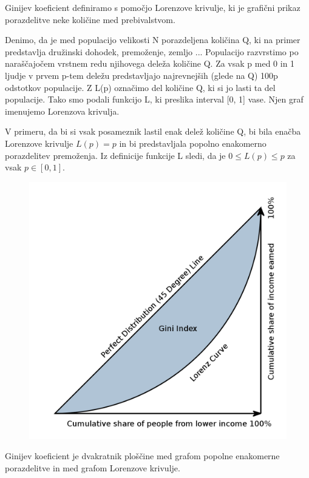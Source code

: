 \documentclass[a4paper,12 pt]{article}
\begin{document}
Ginijev  koeficient  definiramo  s  pomočjo  Lorenzove  krivulje,  ki  je  grafični  prikaz porazdelitve neke količine med prebivalstvom.

Denimo,  da  je  med  populacijo  velikosti  N  porazdeljena  količina  Q,  ki  na  primer  predstavlja  družinski  dohodek,  premoženje,  zemljo  ...   Populacijo  razvrstimo po naraščajočem vrstnem redu njihovega deleža količine  Q.  Za vsak p med 0 in 1 ljudje v prvem p-tem deležu predstavljajo najrevnejših (glede na Q) 100p odstotkov populacije.   Z  L(p)  označimo  del  količine  Q,  ki  si  jo  lasti  ta  del  populacije. Tako smo podali funkcijo L, ki preslika interval [0, 1] vase. Njen graf imenujemo Lorenzova  krivulja. 

V primeru, da bi si vsak posameznik lastil enak delež količine Q, bi bila  enačba  Lorenzove  krivulje  $L(p)  =  p$  in  bi  predstavljala  popolno  enakomerno porazdelitev premoženja.  Iz definicije funkcije L sledi, da je $0 \leq L(p) \leq p$ za vsak $p \in [0, 1]$. 

\begin{figure}
\includegraphics[width= \linewidth]{./slike/lorenzova-krivulja.png}
\end{figure}

Ginijev koeficient je dvakratnik ploščine med grafom popolne enakomerne porazdelitve in med grafom Lorenzove krivulje.
\end{document}
